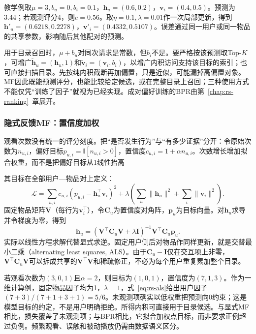 教学例取$\mu=3,b_u=0,b_i=0.1$，$\bm h_u=(0.6,0.2)$，$\bm v_i=(0.4,0.5)$。预测为3.44；若观测评分4，则$e=0.56$。取$\eta=0.1,\lambda=0.01$作一次局部更新，得到$\bm h'_u=(0.6218,0.2278)$，$\bm v'_i=(0.4332,0.5107)$。误差通过同一用户或同一物品的共享参数，影响随后其他配对的预测。

用于目录召回时，$\mu+b_u$对同次请求是常数，但$b_i$不是。要严格按该预测取Top-$K$，可增广$\widetilde{\bm h}_u=(\bm h_u,1)$和$\widetilde{\bm v}_i=(\bm v_i,b_i)$，以增广内积访问支持该目标的索引；也可直接扫描目录。先按纯内积截断再加偏置，只是近似，可能漏掉高偏置对象。MF因此既能预测评分，也能比较给定候选，或在完整目录上召回；三种使用方式不能仅凭“训练了因子”就视为已经实现。成对偏好训练的BPR由第~\ref{chap:rs-ranking}~章展开。

\subsubsection{隐式反馈MF：置信度加权}
\label{sec:rs-implicit-mf}

观看次数没有统一的评分刻度。把“是否发生行为”与“有多少证据”分开：令原始次数为$n_{u,i}$，偏好目标$p_{u,i}=\mathbb I[n_{u,i}>0]$，置信度$c_{u,i}=1+\alpha n_{u,i}$。次数增长增加拟合权重，而不是把偏好目标从1线性抬高

其目标在全部用户—物品对上定义：
\begin{equation}
 \mathcal L=\sum_{u,i}c_{u,i}(p_{u,i}-\bm h_u^\top\bm v_i)^2
 +\lambda\left(\sum_u\|\bm h_u\|^2+\sum_i\|\bm v_i\|^2\right).
 \label{eq:rs-implicit-mf}
\end{equation}
固定物品矩阵$\bm V$（每行为$\bm v_i^\top$），令$\bm C_u$为置信度对角阵，$\bm p_u$为目标向量。对$\bm h_u$求导并令梯度为零，得到
\begin{equation}
 \bm h_u=(\bm V^\top\bm C_u\bm V+\lambda\bm I)^{-1}
             \bm V^\top\bm C_u\bm p_u.
 \label{eq:rs-als}
\end{equation}
实际以线性方程求解代替显式求逆。固定用户侧后对物品作同样更新，就是交替最小二乘（alternating least squares, ALS）。由于$\bm C_u-\bm I$仅在交互项上非零，$\bm V^\top\bm C_u\bm V$可以拆成共享的$\bm V^\top\bm V$和稀疏修正，不必为每个用户重复累加整个目录。

若观看次数为$(3,0,1)$且$\alpha=2$，则目标为$(1,0,1)$，置信度为$(7,1,3)$。作为一维计算例，固定物品因子均为1，$\lambda=1$，式~\eqref{eq:rs-als}给出用户因子$(7+3)/(7+1+3+1)=5/6$。未观测项确实以低权重把预测向0约束；这是模型目标的约定，不是用户明确拒绝。所得内积可直接用于目录候选。与显式MF相比，损失覆盖了未观测项；与BPR相比，它拟合加权点目标，而非要求正例超过负例。频繁观看、误触和被动播放仍需由数据语义区分。

